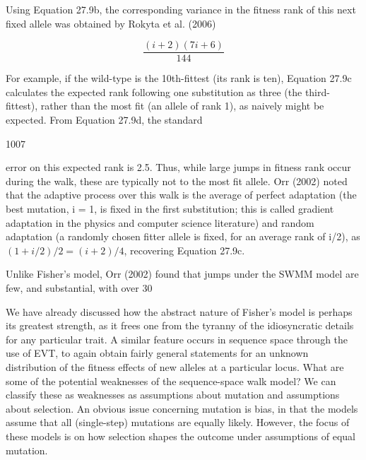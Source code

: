 \documentclass{article}
\begin{document}
Using Equation 27.9b, the corresponding variance in the fitness rank of this next fixed allele was obtained by Rokyta et al. (2006)

\begin{equation}
\frac{(i+2)(7i+6)}{144}
\tag{27.9d}
\label{eq:27_9d}
\end{equation}

For example, if the wild-type is the 10th-fittest (its rank is ten), Equation 27.9c calculates the expected rank following one substitution as three (the third-fittest), rather than the most fit (an allele of rank 1), as naively might be expected. From Equation 27.9d, the standard

1007

error on this expected rank is 2.5. Thus, while large jumps in fitness rank occur during the walk, these are typically not to the most fit allele. Orr (2002) noted that the adaptive process over this walk is the average of perfect adaptation (the best mutation, i = 1, is fixed in the first substitution; this is called gradient adaptation in the physics and computer science literature) and random adaptation (a randomly chosen fitter allele is fixed, for an average rank of i/2), as  $ (1 + i/2)/2 = (i + 2)/4 $, recovering Equation 27.9c.

Unlike Fisher's model, Orr (2002) found that jumps under the SWMM model are few, and substantial, with over 30%

We have already discussed how the abstract nature of Fisher's model is perhaps its greatest strength, as it frees one from the tyranny of the idiosyncratic details for any particular trait. A similar feature occurs in sequence space through the use of EVT, to again obtain fairly general statements for an unknown distribution of the fitness effects of new alleles at a particular locus. What are some of the potential weaknesses of the sequence-space walk model? We can classify these as weaknesses as assumptions about mutation and assumptions about selection. An obvious issue concerning mutation is bias, in that the models assume that all (single-step) mutations are equally likely. However, the focus of these models is on how selection shapes the outcome under assumptions of equal mutation.
\end{document}
